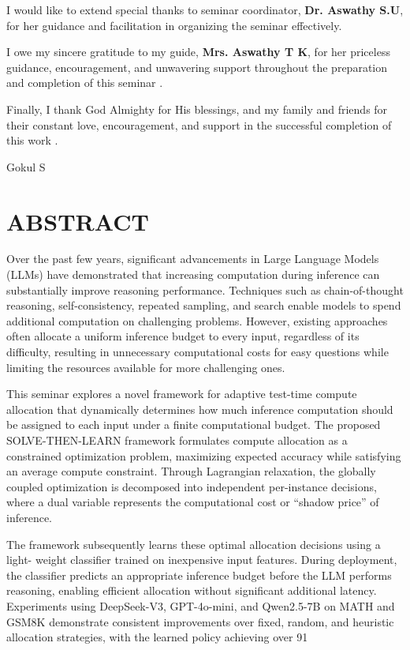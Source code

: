 \documentclass[12pt,a4paper,titlepage]{report}
\begin{document}
\vspace{0.15in}
\noindent I would like to extend special thanks to seminar coordinator, \textbf{Dr. Aswathy S.U}, for her guidance and facilitation in organizing the seminar effectively.

\vspace{0.15in}
\noindent I owe my sincere gratitude to my guide, \textbf{Mrs. Aswathy T K}, for her priceless guidance, encouragement, and unwavering support throughout the preparation and completion of this seminar .

\vspace{0.15in}
\noindent Finally, I thank God Almighty for His blessings, and my family and friends for their constant love, encouragement, and support in the successful completion of this work .

\vspace{0.8in}
\hfill Gokul S

\clearpage

\chapter*{ABSTRACT}

Over the past few years, significant advancements in Large Language Models (LLMs) have demonstrated that increasing computation during inference can substantially improve reasoning performance. Techniques such as chain-of-thought reasoning, self-consistency, repeated sampling, and search enable models to spend additional computation on challenging problems. However, existing approaches often allocate a uniform inference budget to every input, regardless of its difficulty, resulting in unnecessary computational costs for easy questions while limiting the resources available for more challenging ones.

This seminar explores a novel framework for adaptive test-time compute allocation that dynamically determines how much inference computation should be assigned to each input under a finite computational budget. The proposed SOLVE-THEN-LEARN framework formulates compute allocation as a constrained optimization problem, maximizing expected accuracy while satisfying an average compute constraint. Through Lagrangian relaxation, the globally coupled optimization is decomposed into independent per-instance decisions, where a dual variable represents the computational cost or “shadow price” of inference.

The framework subsequently learns these optimal allocation decisions using a light- weight classifier trained on inexpensive input features. During deployment, the classifier predicts an appropriate inference budget before the LLM performs reasoning, enabling efficient allocation without significant additional latency. Experiments using DeepSeek-V3, GPT-4o-mini, and Qwen2.5-7B on MATH and GSM8K demonstrate consistent improvements over fixed, random, and heuristic allocation strategies, with the learned policy achieving over 91%
\end{document}
